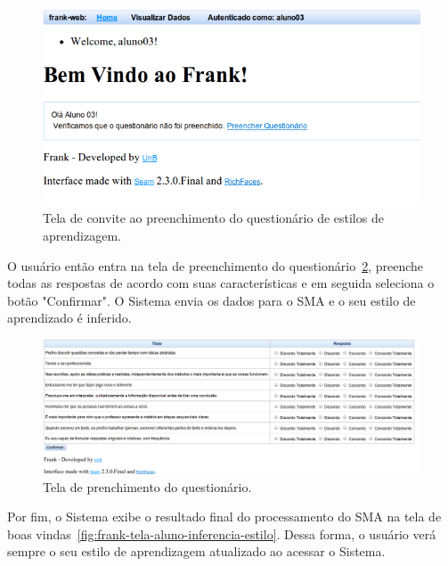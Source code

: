 \begin{figure}
	\centering
	\includegraphics[scale=0.6]{images/frank-tela-aluno-prim-acesso.png}
	\caption{Tela de convite ao preenchimento do questionário de estilos de aprendizagem.}
	\label{fig:frank-tela-aluno-prim-acesso}
\end{figure}

O usuário então entra na tela de preenchimento do questionário~\ref{fig:frank-tela-aluno-preencher-questionario}, preenche todas as respostas de acordo com suas características e em seguida seleciona o botão "Confirmar". O Sistema envia os dados para o SMA e o seu estilo de aprendizado é inferido.

\begin{figure}
	\centering
	\includegraphics[scale=0.4]{images/frank-tela-aluno-preencher-questionario.png}
	\caption{Tela de prenchimento do questionário.}
	\label{fig:frank-tela-aluno-preencher-questionario}
\end{figure}

Por fim, o Sistema exibe o resultado final do processamento do SMA na tela de boas vindas~\ref{fig:frank-tela-aluno-inferencia-estilo}. Dessa forma, o usuário verá sempre o seu estilo de aprendizagem atualizado ao acessar o Sistema.

